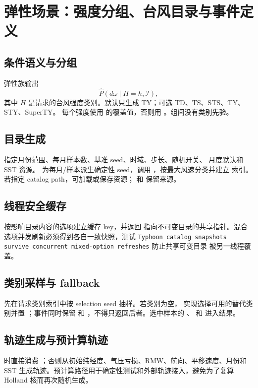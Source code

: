\section{弹性场景：强度分组、台风目录与事件定义}
\label{sec:resilience-scenarios}

\subsection{条件语义与分组}
弹性族输出
\begin{equation}
 \widehat P(d\omega\mid H=h,\mathcal I),
\end{equation}
其中 $H$ 是请求的台风强度类别。默认只生成 TY；可选 TD、TS、STS、TY、STY、SuperTY。
每个强度使用  的覆盖值，否则用
。组间没有类别先验。

\subsection{目录生成}
 指定月份范围、每月样本数、基准 seed、时域、步长、随机开关、
月度默认和 SST 资源。 为每月/样本派生确定性 seed，调用
，按最大风速分类并建立
 索引。若指定 catalog path，可加载或保存资源；
 和  保留来源。

\subsection{线程安全缓存}
 按影响目录内容的选项建立缓存 key，并返回
指向不可变目录的共享指针。混合选项并发刷新必须得到各自一致快照，测试
\texttt{Typhoon catalog snapshots survive concurrent mixed-option refreshes} 防止共享可变目录
被另一线程覆盖。

\subsection{类别采样与 fallback}
 先在请求类别索引中按 selection seed 抽样。若类别为空，
实现选择可用的替代类别并置 ；事件同时保留
 和 ，不得只返回后者。选中样本的
、 和
 进入结果。

\subsection{轨迹生成与预计算轨迹}
 时直接消费
；否则从初始纬经度、气压亏损、RMW、航向、平移速度、月份和 SST
生成轨迹。预计算路径用于确定性测试和外部轨迹接入，避免为了复算 Holland 核而再次随机生成。

